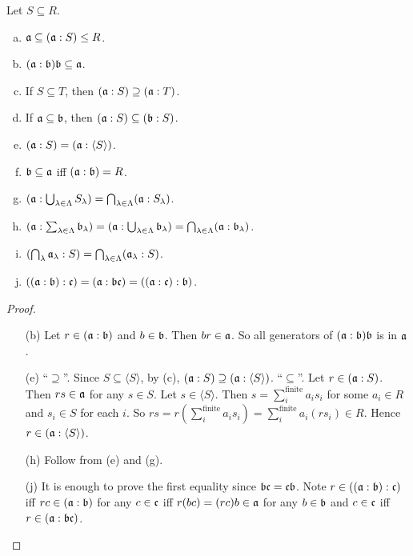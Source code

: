\begin{fact}
    Let $S \subseteq R$.
    \begin{enumerate}[(a)]
        \item $\mathfrak{a} \subseteq (\mathfrak{a}:S) \leq R$.
        \item $(\mathfrak{a}:\mathfrak{b})\mathfrak{b} \subseteq \mathfrak{a}$. 
        \item If $S \subseteq T$, then $(\mathfrak{a}:S) \supseteq (\mathfrak{a}:T)$.
        \item If $\mathfrak{a} \subseteq \mathfrak{b}$, then $(\mathfrak{a}:S) \subseteq (\mathfrak{b}:S)$.
        \item $(\mathfrak{a}:S) = (\mathfrak{a}:\langle S \rangle)$.
        \item $\mathfrak{b} \subseteq \mathfrak{a}$ iff $(\mathfrak{a}:\mathfrak{b}) = R$.
        \item $(\mathfrak{a}: \bigcup_{\lambda \in \Lambda}S_\lambda) = \bigcap_{\lambda \in \Lambda} (\mathfrak{a}:S_\lambda)$.
        \item $(\mathfrak{a}: \sum_{\lambda \in \Lambda}\mathfrak{b}_\lambda) = (\mathfrak{a}: \bigcup_{\lambda \in \Lambda} \mathfrak{b}_\lambda) = \bigcap_{\lambda \in \Lambda}(\mathfrak{a}: \mathfrak{b}_\lambda)$.
        \item $(\bigcap_{\lambda}\mathfrak{a}_\lambda:S) = \bigcap_{\lambda \in \Lambda}(\mathfrak{a}_\lambda:S)$.
        \item $((\mathfrak{a}:\mathfrak{b}):\mathfrak{c}) = (\mathfrak{a}:\mathfrak{b}\mathfrak{c}) = ((\mathfrak{a}:\mathfrak{c}):\mathfrak{b})$.
    \end{enumerate}
\end{fact}

\begin{proof}
    \begin{enumerate}
        \item[(b)]
            Let $r \in (\mathfrak{a}:\mathfrak{b})$ and $b \in \mathfrak{b}$. Then $br \in \mathfrak{a}$. So all generators of $(\mathfrak{a}:\mathfrak{b})\mathfrak{b}$ is in $\mathfrak{a}$.
        \item[(e)]
            ``$\supseteq$''. Since $S \subseteq \langle S \rangle$, by (c), $(\mathfrak{a}:S) \supseteq (\mathfrak{a}:\langle S \rangle)$. ``$\subseteq$''. Let $r \in (\mathfrak{a}:S)$. Then $rs \in \mathfrak{a}$ for any $s \in S$. Let $s \in \langle S \rangle$. Then $s = \sum_{i}^{\text{finite}}a_is_i$ for some $a_i \in R$ and $s_i \in S$ for each $i$. So $rs = r(\sum_i^{\text{finite}}a_is_i) = \sum_i^{\text{finite}} a_i(rs_i) \in R$. Hence $r \in (\mathfrak{a}:\langle S \rangle)$.
        \item[(h)] Follow from (e) and (g).
        \item [(j)]
            It is enough to prove the first equality since $\mathfrak{b}\mathfrak{c} = \mathfrak{c}\mathfrak{b}$. Note $r \in ((\mathfrak{a}:\mathfrak{b}):\mathfrak{c})$ iff $rc \in (\mathfrak{a}:\mathfrak{b})$ for any $c \in \mathfrak{c}$ iff $r(bc) = (rc)b \in \mathfrak{a}$ for any $b \in \mathfrak{b}$ and $c \in \mathfrak{c}$ iff $r \in (\mathfrak{a}:\mathfrak{b}\mathfrak{c})$. 
    \end{enumerate}
\end{proof}


